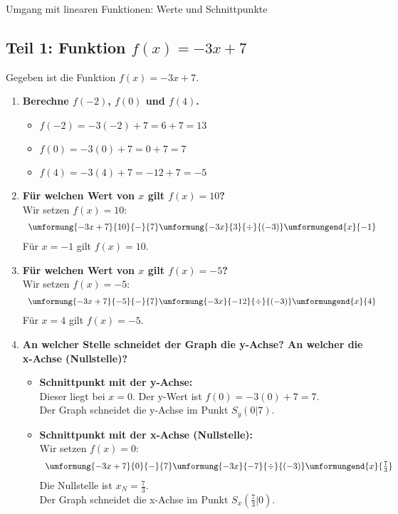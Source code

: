 \begin{loesungsumgebung}{Umgang mit linearen Funktionen: Werte und Schnittpunkte}

\subsection*{Teil 1: Funktion $f(x) = -3x + 7$}
Gegeben ist die Funktion $f(x) = -3x + 7$.

\begin{enumerate}[label=(\alph*)]
    \item \textbf{Berechne $f(-2)$, $f(0)$ und $f(4)$.}
    \begin{itemize}
        \item $f(-2) = -3(-2) + 7 = 6 + 7 = 13$
        \item $f(0) = -3(0) + 7 = 0 + 7 = 7$
        \item $f(4) = -3(4) + 7 = -12 + 7 = -5$
    \end{itemize}

    \item \textbf{Für welchen Wert von $x$ gilt $f(x) = 10$?} \\
    Wir setzen $f(x) = 10$:
    $$
    \begin{array}{r c l c l}
    \umformung{-3x + 7}{10}{-}{7}
    \umformung{-3x}{3}{\div}{(-3)}
    \umformungend{x}{-1}
    \end{array}
    $$
    Für $x=-1$ gilt $f(x)=10$.

    \item \textbf{Für welchen Wert von $x$ gilt $f(x) = -5$?} \\
    Wir setzen $f(x) = -5$:
    $$
    \begin{array}{r c l c l}
    \umformung{-3x + 7}{-5}{-}{7}
    \umformung{-3x}{-12}{\div}{(-3)}
    \umformungend{x}{4}
    \end{array}
    $$
    Für $x=4$ gilt $f(x)=-5$.

    \item \textbf{An welcher Stelle schneidet der Graph die y-Achse? An welcher die x-Achse (Nullstelle)?}
    \begin{itemize}
        \item \textbf{Schnittpunkt mit der y-Achse:} \\
        Dieser liegt bei $x=0$. Der y-Wert ist $f(0) = -3(0) + 7 = 7$. \\
        Der Graph schneidet die y-Achse im Punkt $S_y(0|7)$.
        \item \textbf{Schnittpunkt mit der x-Achse (Nullstelle):} \\
        Wir setzen $f(x)=0$:
        $$
        \begin{array}{r c l c l}
        \umformung{-3x + 7}{0}{-}{7}
        \umformung{-3x}{-7}{\div}{(-3)}
        \umformungend{x}{\frac{7}{3}}
        \end{array}
        $$
        Die Nullstelle ist $x_N = \frac{7}{3}$. \\
        Der Graph schneidet die x-Achse im Punkt $S_x\left(\frac{7}{3}|0\right)$.
    \end{itemize}
\end{enumerate}


\end{loesungsumgebung}
